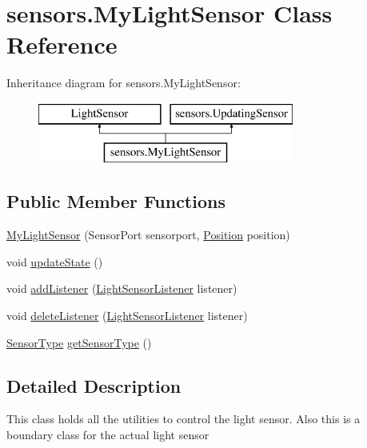 \hypertarget{classsensors_1_1_my_light_sensor}{\section{sensors.\-My\-Light\-Sensor Class Reference}
\label{classsensors_1_1_my_light_sensor}
}
Inheritance diagram for sensors.\-My\-Light\-Sensor\-:\begin{figure}[H]
\begin{center}
\leavevmode
\includegraphics[height=2.000000cm]{classsensors_1_1_my_light_sensor}
\end{center}
\end{figure}
\subsection*{Public Member Functions}
\begin{DoxyCompactItemize}
\item 
\hyperlink{classsensors_1_1_my_light_sensor_a66871b7c407c55db943fa287f5a05546}{My\-Light\-Sensor} (Sensor\-Port sensorport, \hyperlink{enumsensors_1_1_position}{Position} position)
\item 
void \hyperlink{classsensors_1_1_my_light_sensor_a53d99d3eb2357a4a8bcaa4374a0cd322}{update\-State} ()
\item 
void \hyperlink{classsensors_1_1_my_light_sensor_a9f1363af86ed6a3684c0c5350893eaad}{add\-Listener} (\hyperlink{interfacesensors_1_1_light_sensor_listener}{Light\-Sensor\-Listener} listener)
\item 
void \hyperlink{classsensors_1_1_my_light_sensor_a5b7da6d342b87ca4dda0c22c29d352be}{delete\-Listener} (\hyperlink{interfacesensors_1_1_light_sensor_listener}{Light\-Sensor\-Listener} listener)
\item 
\hyperlink{enumsensors_1_1_sensor_type}{Sensor\-Type} \hyperlink{classsensors_1_1_my_light_sensor_a5a65a835bf1f749adf47e2f57d55047b}{get\-Sensor\-Type} ()
\end{DoxyCompactItemize}


\subsection{Detailed Description}
This class holds all the utilities to control the light sensor. Also this is a boundary class for the actual light sensor

